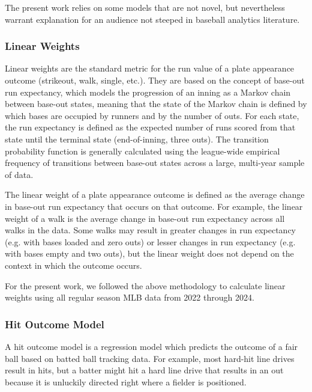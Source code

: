 \documentclass[
  12pt]{article}
\begin{document}
      The present work relies on some models that are not novel, but nevertheless warrant explanation for an audience not steeped in baseball analytics literature.
    
      \subsubsection{Linear Weights}
      \label{sec:linear-weights}

        Linear weights \citep{thorn_hidden_1984} are the standard metric for the run value of a plate appearance outcome (strikeout, walk, single, etc.). They are based on the concept of base-out run expectancy, which models the progression of an inning as a Markov chain between base-out states, meaning that the state of the Markov chain is defined by which bases are occupied by runners and by the number of outs. For each state, the run expectancy is defined as the expected number of runs scored from that state until the terminal state (end-of-inning, three outs). The transition probability function is generally calculated using the league-wide empirical frequency of transitions between base-out states across a large, multi-year sample of data.

        The linear weight of a plate appearance outcome is defined as the average change in base-out run expectancy that occurs on that outcome. For example, the linear weight of a walk is the average change in base-out run expectancy across all walks in the data. Some walks may result in greater changes in run expectancy (e.g. with bases loaded and zero outs) or lesser changes in run expectancy (e.g. with bases empty and two outs), but the linear weight does not depend on the context in which the outcome occurs.

        For the present work, we followed the above methodology to calculate linear weights using all regular season MLB data from 2022 through 2024.
      
      \subsubsection{Hit Outcome Model}
      \label{sec:hit-outcome-model}

        A hit outcome model is a regression model which predicts the outcome of a fair ball based on batted ball tracking data. For example, most hard-hit line drives result in hits, but a batter might hit a hard line drive that results in an out because it is unluckily directed right where a fielder is positioned.
\end{document}
